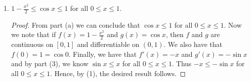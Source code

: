 \documentclass[12pt]{article}
\theoremstyle{definition}
\newcommand{\abs}[1]{\lvert #1 \rvert}
\begin{document}
\begin{enumerate}
\begin{enumerate}[label=(\arabic*)]
\begin{proof}
                                monotonically decreasing on $[0, 1]\subset[0,
                                \pi]$. Also note that $\abs{\cos x}\leq 1$ for
                                all $x\in\mathbb{R}$. Hence, $\cos x\leq 1$ for
                                all $0\leq x\leq 1$. Therefore, by part (a), we
                                have that $0\leq\sin x\leq x$ for all $0\leq
                                x\leq 1$.
                            \end{proof}
                        \item $1-\frac{x^2}{2}\leq\cos x\leq 1$ for all $0\leq
                            x\leq 1$.
                            \begin{proof}
                                From part (a) we can conclude that $\cos x\leq
                                1$ for all $0\leq x\leq 1$. Now we note that if
                                $f(x)=1-\frac{x^2}{2}$ and $g(x)=\cos x$, then
                                $f$ and $g$ are continuous on $[0,1]$ and
                                differentiable on $(0, 1)$. We also have that
                                $f(0)=1=\cos 0$. Finally, we have that 
                                $f'(x)=-x$ and $g'(x)=-\sin x$ and by part (3),
                                we know $\sin x\leq x$ for all $0\leq x\leq 1$.
                                Thus $-x\leq -\sin x$ for all $0\leq x\leq 1$.
                                Hence, by (1), the desired result follows.
                            \end{proof}
                    \end{enumerate}
    \end{enumerate}
\end{document}
